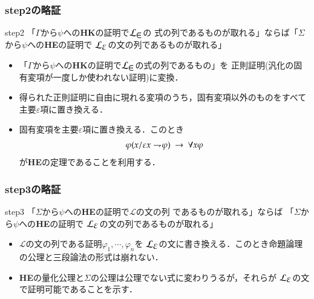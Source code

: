 \documentclass[dvipdfmx,10pt,notheorems]{beamer}
\theoremstyle{definition}
\newcommand{\lang}[1]{\mathcal{L}_{\scalebox{1.2}{$#1$}}} %
\newcommand{\negation}{\rightharpoondown\hspace{-0.25em}} %
\newcommand{\rarrow}{\hspace{0.25em}\rightarrow\hspace{0.25em}} %
\begin{document}
\begin{frame}\frametitle{step2の略証}
	\begin{block}{step2}
		「$\Gamma$から$\psi$への{\bf HK}の証明で$\lang{\in}$の
		式の列であるものが取れる」ならば「$\Sigma$から$\psi$への{\bf HE}の証明で
		$\lang{\varepsilon}$の文の列であるものが取れる」
	\end{block}
	
	\begin{itemize}
		\item 「$\Gamma$から$\psi$への{\bf HK}の証明で$\lang{\in}$の式の列であるもの」を
			正則証明(汎化の固有変項が一度しか使われない証明)に変換．
			
		\item 得られた正則証明に自由に現れる変項のうち，固有変項以外のものをすべて主要$\varepsilon$項に置き換える．
		
		\item 固有変項を主要$\varepsilon$項に置き換える．このとき
			\begin{align}
				\varphi(x/\varepsilon x \negation \varphi) \rarrow \forall x \varphi
			\end{align}
			が{\bf HE}の定理であることを利用する．
	\end{itemize}	
\end{frame}

\begin{frame}\frametitle{step3の略証}
	\begin{block}{step3}
		「$\Sigma$から$\psi$への{\bf HE}の証明で$\mathcal{L}$の文の列
		であるものが取れる」ならば 「$\Sigma$から$\psi$への{\bf HE}の証明で
		$\lang{\varepsilon}$の文の列であるものが取れる」
	\end{block}
	
	\begin{itemize}
		\item $\mathcal{L}$の文の列である証明$\varphi_{1},\cdots,\varphi_{n}$を
			$\lang{\varepsilon}$の文に書き換える．このとき命題論理の公理と三段論法の形式は崩れない．
		
		\item {\bf HE}の量化公理と$\Sigma$の公理は公理でない式に変わりうるが，それらが
			$\lang{\varepsilon}$の文で証明可能であることを示す．
	\end{itemize}	
\end{frame}
\end{document}
